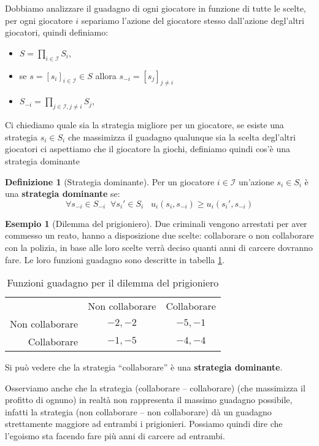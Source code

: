 \documentclass[a4paper]{article}
\theoremstyle{plain}
\theoremstyle{definition}
\newtheorem{mydef}[myteo]{Definizione}
\newtheorem{myes}[myteo]{Esempio}
\theoremstyle{remark}
\newcommand{\pa}[1]{\left(#1\right)}
\newcommand{\bra}[1]{\left[#1\right]}
\begin{document}
Dobbiamo analizzare il guadagno di ogni giocatore in funzione di tutte
le scelte, per ogni giocatore $i$ separiamo l'azione del giocatore
stesso dall'azione degl'altri giocatori, quindi definiamo:
\begin{itemize}
\item $S = \prod _{i\in\mathcal{I}} S_i$,
\item se $s = \bra{s_i}_{i\in\mathcal{I}} \in S$ allora $s_{-i} =
  \bra{s_j}_{j\neq i}$
\item $\displaystyle S_{-i} = \prod _{j\in\mathcal{I},j\neq i} S_j$,
\end{itemize}

Ci chiediamo quale sia la strategia migliore per un giocatore, se
esiste una strategia $s_i\in S_i$ che massimizza il guadagno qualunque
sia la scelta degl'altri giocatori ci aspettiamo che il giocatore la
giochi, definiamo quindi cos'è una strategia dominante

\begin{mydef}[Strategia dominante]
  Per un giocatore $i\in\mathcal{I}$ un'azione $s_i\in S_i$ è una
  \textbf{strategia dominante} se:
  \[ \forall s_{-i} \in S_{-i}\;\; \forall s_i' \in S_i\;\;\;
    u_i\pa{s_i,s_{-i}} \ge u_i\pa{s_i',s_{-i}} \]
\end{mydef}

\begin{myes}[Dilemma del prigioniero]
  Due criminali vengono arrestati per aver commesso un reato, hanno a
  disposizione due scelte: collaborare o non collaborare con la
  polizia, in base alle loro scelte verrà deciso quanti anni di
  carcere dovranno fare. Le loro funzioni guadagno sono descritte in
  tabella \ref{tab:u1u2-prigioniero}.
  
  \begin{table}[!ht]
    \centering
    \begin{tabular}{rcc}
      & Non collaborare & Collaborare \\
      \cline{2-3}
      Non collaborare & \multicolumn{1}{|c|}{$-2,-2$} & \multicolumn{1}{|c|}{$-5,-1$}  \\
      \cline{2-3}
      Collaborare & \multicolumn{1}{|c|}{$-1,-5$} & \multicolumn{1}{|c|}{$-4,-4$}  \\
      \cline{2-3}
    \end{tabular}
    \caption{Funzioni guadagno per il dilemma del prigioniero}
    \label{tab:u1u2-prigioniero}
  \end{table}
  
  Si può vedere che la strategia ``collaborare'' è una
  \textbf{strategia dominante}.

  Osserviamo anche che la strategia (collaborare -- collaborare) (che
  massimizza il profitto di ognuno) in realtà non rappresenta il
  massimo guadagno possibile, infatti la strategia (non collaborare --
  non collaborare) dà un guadagno strettamente maggiore ad entrambi i
  prigionieri. Possiamo quindi dire che l'egoismo sta facendo fare più
  anni di carcere ad entrambi.
\end{myes}
\end{document}
